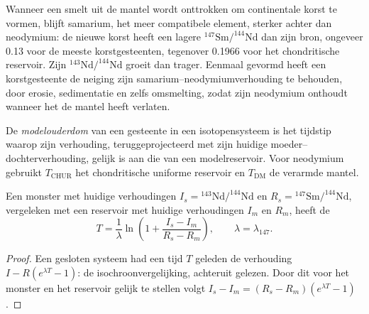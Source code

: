 Wanneer een smelt uit de mantel wordt onttrokken om continentale korst te vormen, blijft samarium,
het meer compatibele element, sterker achter dan neodymium: de nieuwe korst heeft een lagere
$^{147}\mathrm{Sm}/^{144}\mathrm{Nd}$ dan zijn bron, ongeveer 0.13 voor de meeste
korstgesteenten, tegenover 0.1966 voor het chondritische reservoir. Zijn
$^{143}\mathrm{Nd}/^{144}\mathrm{Nd}$ groeit dan trager. Eenmaal gevormd heeft een
korstgesteente de neiging zijn samarium--neodymiumverhouding te behouden, door erosie,
sedimentatie en zelfs omsmelting, zodat zijn neodymium onthoudt wanneer het de
mantel heeft verlaten.

\begin{definition}[Modelouderdom]\label{def:b3:advanced-geochronology:model-age}
De \emph{modelouderdom} van een gesteente in een isotopensysteem is het
tijdstip waarop zijn verhouding, teruggeprojecteerd met zijn huidige moeder--dochterverhouding,
gelijk is aan die van een modelreservoir. Voor neodymium gebruikt $T_{\mathrm{CHUR}}$
het chondritische uniforme reservoir en $T_{\mathrm{DM}}$ de verarmde
mantel.
\end{definition}

\begin{theorem}[Modelouderdom]\label{thm:b3:advanced-geochronology:model-age}
Een monster met huidige verhoudingen $I_s = {}^{143}\mathrm{Nd}/^{144}\mathrm{Nd}$ en
$R_s = {}^{147}\mathrm{Sm}/^{144}\mathrm{Nd}$, vergeleken met een reservoir met huidige
verhoudingen $I_m$ en $R_m$, heeft de 
\[
T = \frac1\lambda\ln\left(1 + \frac{I_s - I_m}{R_s - R_m}\right),
\qquad \lambda = \lambda_{147}.
\]
\end{theorem}

\begin{proof}
Een gesloten systeem had een tijd $T$ geleden de verhouding $I - R(e^{\lambda T} - 1)$:
de isochroonvergelijking, achteruit gelezen. Door dit voor het monster en het
reservoir gelijk te stellen volgt $I_s - I_m = (R_s - R_m)(e^{\lambda T} - 1)$.
\end{proof}

